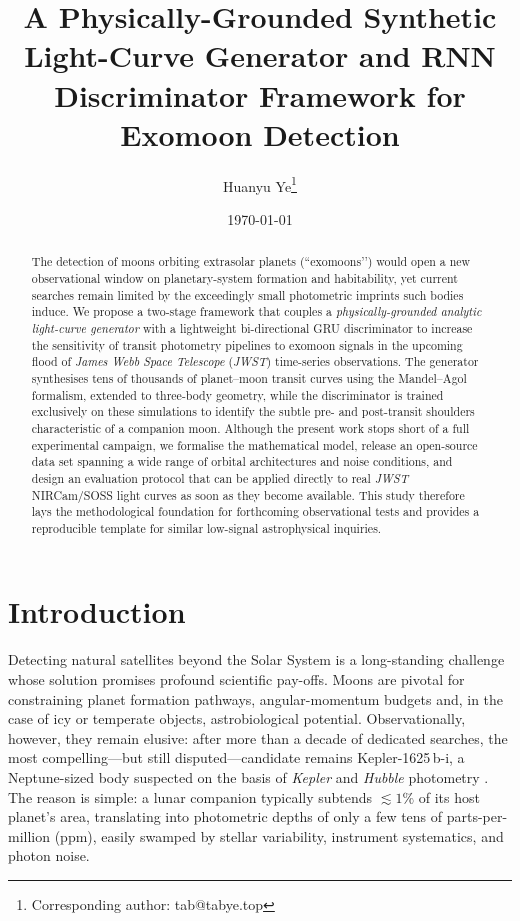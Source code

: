 \documentclass[11pt]{article}
\title{\textbf{A Physically-Grounded Synthetic Light-Curve Generator and RNN Discriminator Framework for Exomoon Detection}}
\author[1]{Huanyu Ye\thanks{Corresponding author: tab@tabye.top}}
\date{\today}
\begin{document}
\maketitle

\begin{abstract}
	The detection of moons orbiting extrasolar planets (``exomoons’’) would open a new observational window on planetary-system formation and habitability, yet current searches remain limited by the exceedingly small photometric imprints such bodies induce.  We propose a two-stage framework that couples a \emph{physically-grounded analytic light-curve generator} with a lightweight bi-directional GRU discriminator to increase the sensitivity of transit photometry pipelines to exomoon signals in the upcoming flood of \textit{James Webb Space Telescope} (\textit{JWST}) time-series observations.  The generator synthesises tens of thousands of planet–moon transit curves using the Mandel–Agol formalism, extended to three-body geometry, while the discriminator is trained exclusively on these simulations to identify the subtle pre- and post-transit shoulders characteristic of a companion moon.  Although the present work stops short of a full experimental campaign, we formalise the mathematical model, release an open-source data set spanning a wide range of orbital architectures and noise conditions, and design an evaluation protocol that can be applied directly to real \textit{JWST} NIRCam/SOSS light curves as soon as they become available.  This study therefore lays the methodological foundation for forthcoming observational tests and provides a reproducible template for similar low-signal astrophysical inquiries.
\end{abstract}

\newpage

\tableofcontents

\newpage

\section{Introduction}\label{sec:intro}
Detecting natural satellites beyond the Solar System is a long-standing challenge whose solution promises profound scientific pay-offs.  Moons are pivotal for constraining planet formation pathways, angular-momentum budgets and, in the case of icy or temperate objects, astrobiological potential.  Observationally, however, they remain elusive: after more than a decade of dedicated searches, the most compelling—but still disputed—candidate remains Kepler-1625\,b-i, a Neptune-sized body suspected on the basis of \textit{Kepler} and \textit{Hubble} photometry \citep{Teachey2018}.  The reason is simple: a lunar companion typically subtends $\lesssim\!1\%$ of its host planet’s area, translating into photometric depths of only a few tens of parts-per-million (ppm), easily swamped by stellar variability, instrument systematics, and photon noise.
\end{document}
